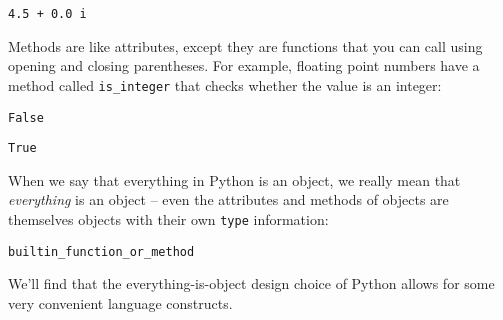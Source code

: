 \begin{verbatim}
4.5 + 0.0 i
\end{verbatim}

Methods are like attributes, except they are functions that you can call
using opening and closing parentheses. For example, floating point
numbers have a method called \texttt{is\_integer} that checks whether
the value is an integer:

\begin{Shaded}
\begin{Highlighting}[]
\OperatorTok{=} 
\end{Highlighting}
\end{Shaded}

\begin{verbatim}
False
\end{verbatim}

\begin{Shaded}
\begin{Highlighting}[]
\OperatorTok{=} 
\end{Highlighting}
\end{Shaded}

\begin{verbatim}
True
\end{verbatim}

When we say that everything in Python is an object, we really mean that
\emph{everything} is an object -- even the attributes and methods of
objects are themselves objects with their own \texttt{type} information:

\begin{Shaded}
\begin{Highlighting}[]
\end{Highlighting}
\end{Shaded}

\begin{verbatim}
builtin_function_or_method
\end{verbatim}

We'll find that the everything-is-object design choice of Python allows
for some very convenient language constructs.
